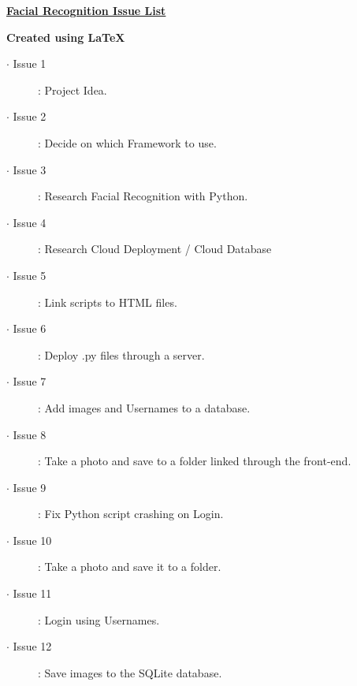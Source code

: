 \documentclass{article}
\begin{document}
\textbf{\underline{Facial Recognition Issue List}}

\textbf{Created using LaTeX}

\begin{description}
\item[$\cdot$ Issue 1]: Project Idea.
\item[$\cdot$ Issue 2]: Decide on which Framework to use.
\item[$\cdot$ Issue 3]: Research Facial Recognition with Python.
\item[$\cdot$ Issue 4]: Research Cloud Deployment / Cloud Database
\item[$\cdot$ Issue 5]: Link scripts to HTML files.
\item[$\cdot$ Issue 6]: Deploy .py files through a server.
\item[$\cdot$ Issue 7]: Add images and Usernames to a database.
\item[$\cdot$ Issue 8]: Take a photo and save to a folder linked through the front-end.
\item[$\cdot$ Issue 9]: Fix Python script crashing on Login.
\item[$\cdot$ Issue 10]: Take a photo and save it to a folder.
\item[$\cdot$ Issue 11]: Login using Usernames.
\item[$\cdot$ Issue 12]: Save images to the SQLite database.
\end{description}
\end{document}
